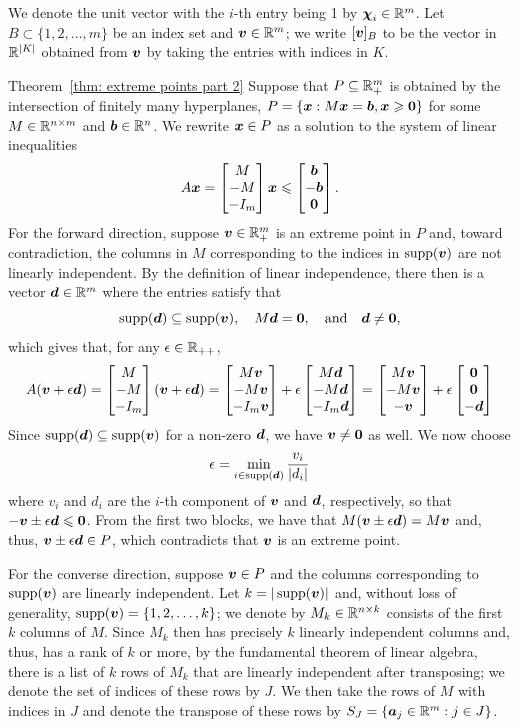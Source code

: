 We denote the unit vector with the $i$-th entry being 1 by $\boldsymbol\chi_i\in\mathbb R^m$. Let $B\subset\{1,2,\dots, m\}$ be an index set and ${\boldsymbol v}\in\mathbb R^m$; we write $[{\boldsymbol v}]_B$ to be the vector in $\mathbb R^{|K|}$ obtained from ${\boldsymbol v}$ by taking the entries with indices in $K$. 

\begin{proofof}{Theorem~\ref{thm: extreme points part 2}}
Suppose that $P\subseteq \mathbb R^m_+$ is obtained by the intersection of finitely many hyperplanes, $P =\{ {\boldsymbol x}:  M\boldsymbol x = {\boldsymbol b}, {\boldsymbol x}\geqslant\boldsymbol0\}$ for some $M\in\mathbb R^{n\times m}$ and ${\boldsymbol b}\in\mathbb R^n$. 
We rewrite ${\boldsymbol x}\in P$ as a solution to the system of linear inequalities  
\[ A {\boldsymbol x}  = \begin{bmatrix} M \\ -M \\ -I_m \end{bmatrix} {\boldsymbol x} \leqslant \begin{bmatrix} {\boldsymbol b} \\ -{\boldsymbol b}\\ \boldsymbol0 \end{bmatrix}. \]
For the forward direction, suppose ${\boldsymbol v}\in\mathbb R_+^m$ is an extreme point in $P$ and, toward contradiction, the columns in $M$ corresponding to the indices in $\operatorname{supp}({\boldsymbol v})$ are not linearly independent. By the definition of linear independence, there then is a vector ${\boldsymbol d} \in\mathbb R^m$ where the entries satisfy that
\[\operatorname{supp}({\boldsymbol d})\subseteq \operatorname{supp}({\boldsymbol v}),\quad M{\boldsymbol d} = \boldsymbol0, \quad \text{and} \quad  {\boldsymbol d}\neq \boldsymbol0, \]
which gives that, for any $\epsilon\in\mathbb R_{++}$, 
\[A({\boldsymbol v} + \epsilon{\boldsymbol d}) 
= \begin{bmatrix} M \\ -M \\ -I_m \end{bmatrix}({\boldsymbol v} + \epsilon{\boldsymbol d}) 
= \begin{bmatrix} M{\boldsymbol v} \\ -M{\boldsymbol v} \\ -I_m{\boldsymbol v} \end{bmatrix} + \epsilon\begin{bmatrix} M{\boldsymbol d} \\ -M{\boldsymbol d} \\ -I_m{\boldsymbol d} \end{bmatrix} 
= \begin{bmatrix} M{\boldsymbol v} \\ -M{\boldsymbol v} \\ -{\boldsymbol v} \end{bmatrix} + \epsilon\begin{bmatrix} \boldsymbol0 \\ \boldsymbol0 \\ -{\boldsymbol d} \end{bmatrix} 
\]
Since $\operatorname{supp}({\boldsymbol d})\subseteq \operatorname{supp}({\boldsymbol v})$ for a non-zero ${\boldsymbol d}$, we have ${\boldsymbol v}\neq \boldsymbol0$ as well. We now choose 
\[\epsilon = \min_{i\in\operatorname{supp}({\boldsymbol d})} \frac{v_i}{|d_i|} \] 
where $v_i$ and $d_i$ are the $i$-th component of ${\boldsymbol v}$ and ${\boldsymbol d}$, respectively, so that $-{\boldsymbol v} \pm \epsilon {\boldsymbol d} \leqslant \boldsymbol0$. From the first two blocks, we have that $M({\boldsymbol v} \pm \epsilon {\boldsymbol d}) = M{\boldsymbol v}$ and, thus, ${\boldsymbol v} \pm \epsilon{\boldsymbol d}\in P$, which contradicts that ${\boldsymbol v}$ is an extreme point. 

For the converse direction, suppose ${\boldsymbol v}\in P$ and the columns corresponding to $\operatorname{supp}({\boldsymbol v})$ are linearly independent. Let $k = |\operatorname{supp}({\boldsymbol v})|$ and, without loss of generality, $\operatorname{supp}({\boldsymbol v}) = \{1, 2, \dots, k\}$; we denote by $M_k\in\mathbb R^{n\times k}$ consists of the first $k$ columns of $M$.  Since $M_k$ then has precisely $k$ linearly independent columns and, thus, has a rank of $k$ or more, by the fundamental theorem of linear algebra, there is a list of $k$ rows of $M_k$ that are linearly independent after transposing; we denote the set of indices of these rows by $J$. We then take the rows of $M$ with indices in $J$ and denote the transpose of these rows by $S_J = \{ {\boldsymbol a}_j\in\mathbb R^m: j\in J \}$. 


\end{proofof}
